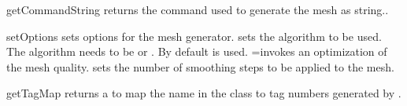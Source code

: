 \begin{methoddesc}[Design]{getCommandString}{}
returns the \gmshextern command used to generate the mesh as string..
\end{methoddesc}

\begin{methoddesc}[Design]{setOptions}{}
sets options for the mesh generator.  sets the algorithm to be used.
The algorithm needs to be 
or . By default  is used. =\True invokes an optimization of the mesh quality.  sets the number of smoothing steps to be applied to the mesh.  
\end{methoddesc}

\begin{methoddesc}[Design]{getTagMap}{}
returns a  to map the name  in the class to tag numbers generated by \gmshextern.
\end{methoddesc}
